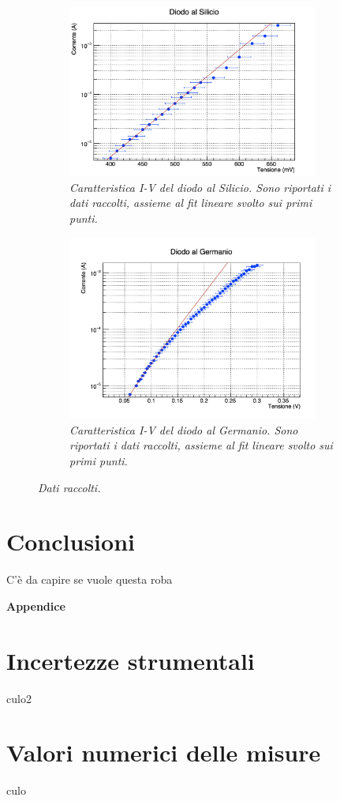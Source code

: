 \documentclass[11pt, a4paper, twoside]{article}
\begin{document}
  \begin{figure}[H]
    \centering
    \begin{subfigure}[t]{.47\textwidth}
      \includegraphics[width=8.25cm]{./assets/1/silicio.png}
      \caption{
        \emph{
          Caratteristica I-V del diodo al Silicio. Sono riportati i dati raccolti, assieme al fit lineare svolto sui primi punti.
        }
      }
      \label{fig:caratteristica-silicio}
    \end{subfigure}
    \hspace{5mm}
    \begin{subfigure}[t]{.47\textwidth}
      \includegraphics[width=8.25cm]{./assets/1/germanio.png}
      \caption{
        \emph{
           Caratteristica I-V del diodo al Germanio. Sono riportati i dati raccolti, assieme al fit lineare svolto sui primi punti.
        }
      }
      \label{fig:caratteristica-germanio}
    \end{subfigure}
    \caption{\emph{Dati raccolti.}
    \label{fig:caratteristiche-iv}}
  \end{figure}

\section{Conclusioni}\label{sec:conclusioni}
  C'è da capire se vuole questa roba

\newpage
\appendix
\textbf{\huge{Appendice}}
\section{Incertezze strumentali}\label{sec:incertezze-strumentali}
  culo2

\section{Valori numerici delle misure}\label{sec:valori-misure}
  culo


\end{document}
